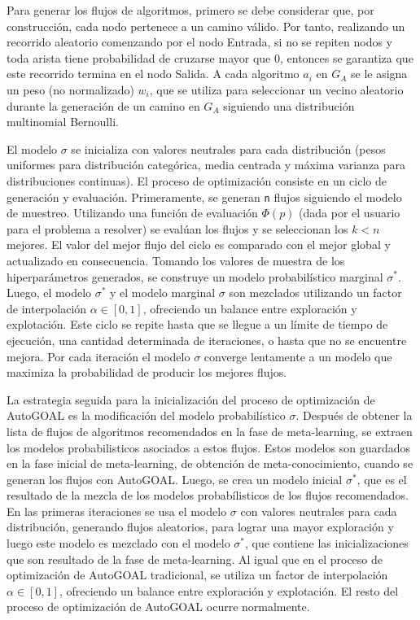 Para generar los flujos de algoritmos, primero se debe considerar que, por construcción, cada nodo pertenece a un camino válido. Por tanto, realizando un recorrido aleatorio comenzando por el nodo Entrada, si no se repiten nodos y toda arista tiene probabilidad de cruzarse mayor que 0, entonces se garantiza que este recorrido termina en el nodo Salida. A cada algoritmo $a_i$ en $G_A$ se le asigna un peso (no normalizado) $w_i$, que se utiliza para seleccionar un vecino aleatorio durante la generación de un camino en $G_A$ siguiendo una distribución multinomial Bernoulli.

El modelo $\sigma$ se inicializa con valores neutrales para cada distribución (pesos uniformes para distribución categórica, media centrada y máxima varianza para distribuciones continuas). El proceso de optimización consiste en un ciclo de generación y evaluación. Primeramente, se generan \texttt{n} flujos siguiendo el modelo de muestreo. Utilizando una función de evaluación $\Phi(p)$ (dada por el usuario para el problema a resolver) se evalúan los flujos y se seleccionan los $k < n$ mejores. El valor del mejor flujo del ciclo es comparado con el mejor global y actualizado en consecuencia. Tomando los valores de muestra de los hiperparámetros generados, se construye un modelo probabilístico marginal $\sigma^*$. Luego, el modelo $\sigma^*$ y el modelo marginal $\sigma$ son mezclados utilizando un factor de interpolación $\alpha \in [0, 1]$, ofreciendo un balance entre exploración y explotación. Este ciclo se repite hasta que se llegue a un límite de tiempo de ejecución, una cantidad determinada de iteraciones, o hasta que no se encuentre mejora. Por cada iteración el modelo $\sigma$ converge lentamente a un modelo que maximiza la probabilidad de producir los mejores flujos. 

La estrategia seguida para la inicialización del proceso de optimización de AutoGOAL es la modificación del modelo probabilístico $\sigma$. Después de obtener la lista de flujos de algoritmos recomendados en la fase de meta-learning, se extraen los modelos probabilisticos asociados a estos flujos. Estos modelos son guardados en la fase inicial de meta-learning, de obtención de meta-conocimiento, cuando se generan los flujos con AutoGOAL. Luego, se crea un modelo inicial $\sigma^*$, que es el resultado de la mezcla de los modelos probabílisticos de los flujos recomendados. En las primeras iteraciones se usa el modelo $\sigma$ con valores neutrales para cada distribución, generando flujos aleatorios, para lograr una mayor exploración y luego este modelo es mezclado con el modelo $\sigma^*$, que contiene las inicializaciones que son resultado de la fase de meta-learning. Al igual que en el proceso de optimización de AutoGOAL tradicional, se utiliza un factor de interpolación $\alpha \in [0, 1]$, ofreciendo un balance entre exploración y explotación. El resto del proceso de optimización de AutoGOAL ocurre normalmente.

